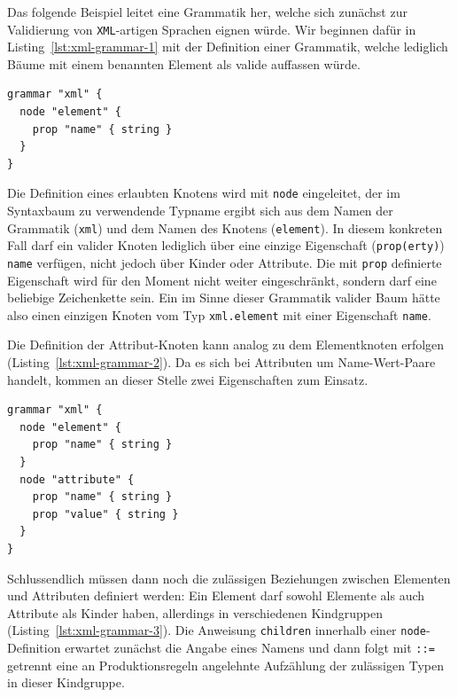 \documentclass[paper=a4,fontsize=11pt,parskip=half]{scrartcl}
\begin{document}
Das folgende Beispiel leitet eine Grammatik her, welche sich zunächst zur Validierung von \texttt{XML}-artigen Sprachen eignen würde. Wir beginnen dafür in Listing~\ref{lst:xml-grammar-1} mit der Definition einer Grammatik, welche lediglich Bäume mit einem benannten Element als valide auffassen würde.

\begin{lstlisting}[float=h, label={lst:xml-grammar-1},caption={\texttt{XML} Schritt 1 - Elemente mit Namen},captionpos=b,language={Grammar}]
grammar "xml" {
  node "element" {
    prop "name" { string }
  }
}
\end{lstlisting}

Die Definition eines erlaubten Knotens wird mit \texttt{node} eingeleitet, der im Syntaxbaum zu verwendende Typname ergibt sich aus dem Namen der Grammatik (\texttt{xml}) und dem Namen des Knotens (\texttt{element}). In diesem konkreten Fall darf ein valider Knoten lediglich über eine einzige Eigenschaft (\texttt{prop(erty)}) \texttt{name} verfügen, nicht jedoch über Kinder oder Attribute. Die mit \texttt{prop} definierte Eigenschaft wird für den Moment nicht weiter eingeschränkt, sondern darf eine beliebige Zeichenkette sein. Ein im Sinne dieser Grammatik valider Baum hätte also einen einzigen Knoten vom Typ \texttt{xml.element} mit einer Eigenschaft \texttt{name}.

Die Definition der Attribut-Knoten kann analog zu dem Elementknoten erfolgen (Listing~\ref{lst:xml-grammar-2}). Da es sich bei Attributen um Name-Wert-Paare handelt, kommen an dieser Stelle zwei Eigenschaften zum Einsatz.

\begin{lstlisting}[float=h, label={lst:xml-grammar-2},caption={\texttt{XML} Schritt 2 - Elemente mit Namen, Attribute mit Schlüssel-Wert-Paaren},captionpos=b,language={Grammar}]
grammar "xml" {
  node "element" {
    prop "name" { string }
  }
  node "attribute" {
    prop "name" { string }
    prop "value" { string }
  }
}
\end{lstlisting}

Schlussendlich müssen dann noch die zulässigen Beziehungen zwischen Elementen und Attributen definiert werden: Ein Element darf sowohl Elemente als auch Attribute als Kinder haben, allerdings in verschiedenen Kindgruppen (Listing~\ref{lst:xml-grammar-3}). Die Anweisung \texttt{children} innerhalb einer \texttt{node}-Definition erwartet zunächst die Angabe eines Namens und dann folgt mit \texttt{::=} getrennt eine an Produktionsregeln angelehnte Aufzählung der zulässigen Typen in dieser Kindgruppe.
\end{document}
